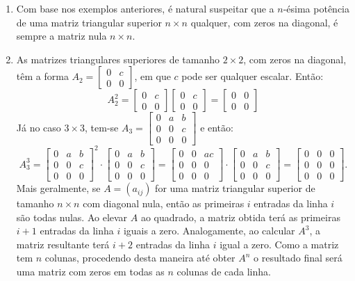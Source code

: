 \documentclass[12pt,a4paper]{article}
\begin{document}
\begin{enumerate}
\begin{enumerate}
\begin{enumerate}
\item Com base nos exemplos anteriores, é natural suspeitar que a $n$-ésima potência de uma matriz triangular superior $n\times n$ qualquer, com zeros na diagonal, é sempre a matriz nula $n\times n$.
\item As matrizes triangulares superiores de tamanho $2 \times 2$, com zeros na diagonal, têm a forma $A_2 =
\begin{bmatrix}
0 & c\\
0 & 0
\end{bmatrix}$, em que $c$ pode ser qualquer escalar. Então:
\[
A_2^2 =
\begin{bmatrix}
0 & c\\
0 & 0
\end{bmatrix}
\begin{bmatrix}
0 & c\\
0 & 0
\end{bmatrix}
=
\begin{bmatrix}
0 & 0\\
0 & 0
\end{bmatrix}
\]
Já no caso $3 \times 3$, tem-se $A_3=
\begin{bmatrix}
0 & a & b \\
0 & 0 & c \\
0 & 0 & 0
\end{bmatrix}$ e então:
\[
A_3^3 =
\begin{bmatrix}
0 & a & b \\
0 & 0 & c \\
0 & 0 & 0
\end{bmatrix}^2
\cdot
\begin{bmatrix}
0 & a & b \\
0 & 0 & c \\
0 & 0 & 0
\end{bmatrix}
=
\begin{bmatrix}
0 & 0 & ac \\
0 & 0 & 0 \\
0 & 0 & 0
\end{bmatrix}
\cdot
\begin{bmatrix}
0 & a & b \\
0 & 0 & c \\
0 & 0 & 0
\end{bmatrix}
=
\begin{bmatrix}
0 & 0 & 0 \\
0 & 0 & 0 \\
0 & 0 & 0
\end{bmatrix}.
\]
Mais geralmente, se $A = (a_{ij})$ for uma matriz triangular superior de tamanho $n \times n$ com diagonal nula, então as primeiras $i$ entradas da linha $i$ são todas nulas. Ao elevar $A$ ao quadrado, a matriz obtida terá as primeiras $i+1$ entradas da linha $i$ iguais a zero. Analogamente, ao calcular $A^3$, a matriz resultante terá $i+2$ entradas da linha $i$ igual a zero. Como a matriz tem $n$ colunas, procedendo desta maneira até obter $A^n$ o resultado final será uma matriz com zeros em todas as $n$ colunas de cada linha.

\end{enumerate}
\end{enumerate}
\end{enumerate}
\end{document}
